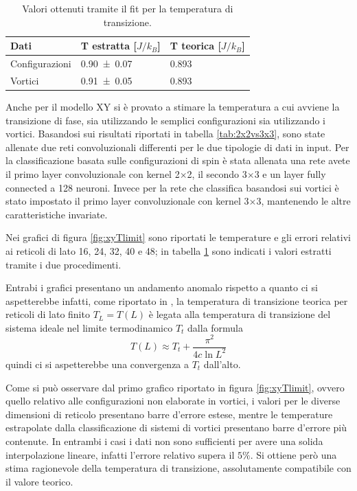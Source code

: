 \documentclass{article}
\begin{document}
\begin{table}[!ht]
\begin{center}
\begin{tabular}{lll}
\toprule
Dati & T estratta [$J/k_B$] & T teorica [$J/k_B$] \\
\midrule
Configurazioni & \num{0.90 \pm 0.07} & \num{0.893}\\
Vortici & \num{0.91 \pm0.05}  & \num{0.893} \\
\bottomrule
\end{tabular}
\end{center}
\caption{Valori ottenuti tramite il fit per la temperatura di transizione.}
\label{tab:Txy}
\end{table}

Anche per il modello XY si è provato a stimare la temperatura a cui avviene la transizione di fase, sia utilizzando le semplici configurazioni sia utilizzando i vortici.
Basandosi sui risultati riportati in tabella \ref{tab:2x2vs3x3}, sono state allenate due reti convoluzionali differenti per le due tipologie di dati in input.
Per la classificazione basata sulle configurazioni di spin è stata allenata una rete avete il primo layer convoluzionale con kernel 2$\times$2, il secondo 3$\times$3 e un layer fully connected a 128 neuroni.
Invece per la rete che classifica basandosi sui vortici è stato impostato il primo layer convoluzionale con kernel 3$\times$3, mantenendo le altre caratteristiche invariate.

Nei grafici di figura \ref{fig:xyTlimit} sono riportati le temperature e gli errori relativi ai reticoli di lato 16, 24, 32, 40 e 48; in tabella \ref{tab:Txy} sono indicati i valori estratti tramite i due procedimenti.

Entrabi i grafici presentano un andamento anomalo rispetto a quanto ci si aspetterebbe infatti, come riportato in \cite{melko}, la temperatura di transizione teorica per reticoli di lato finito $T_L=T(L)$ è legata alla temperatura di transizione del sistema ideale nel limite termodinamico $T_t$ dalla formula
\begin{equation}
T(L) \approx T_t + \frac{\pi^2}{4c \ln{L}^2}
\label{formula:TL}
\end{equation}
quindi ci si aspetterebbe una convergenza a $T_t$ dall'alto.

Come si può osservare dal primo grafico riportato in figura \ref{fig:xyTlimit}, ovvero quello relativo alle configurazioni non elaborate in vortici, i valori per le diverse dimensioni di reticolo presentano barre d'errore estese, mentre le temperature estrapolate dalla classificazione di sistemi di vortici presentano barre d'errore più contenute.
In entrambi i casi i dati non sono sufficienti per avere una solida interpolazione lineare, infatti l'errore relativo supera il $5\%$.
Si ottiene però una stima ragionevole della temperatura di transizione, assolutamente compatibile con il valore teorico.
\end{document}

